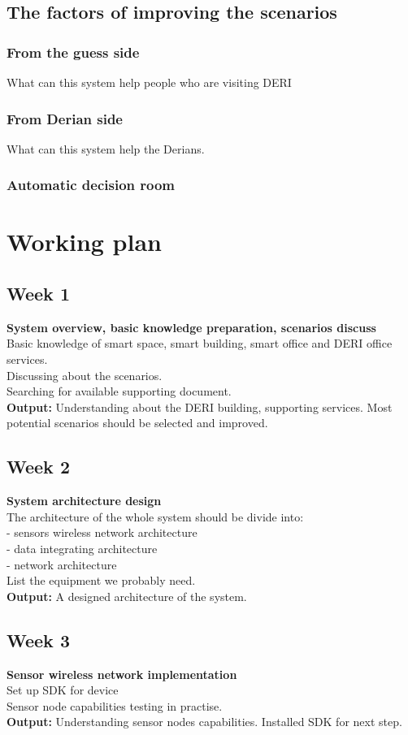 \documentclass[a4paper]{llncs}
\newcommand{\head}[1]{\textnormal {\textbf{#1}}}
\begin{document}
\subsection{The factors of improving the scenarios}
\subsubsection{From the guess side}
What can this system help  people who are visiting DERI
 \subsubsection{From Derian side}
What can this system help the Derians.
\subsubsection{Automatic decision room}

\section{Working plan}
\subsection{Week 1}
\head{System overview, basic knowledge preparation, scenarios discuss }\\
Basic knowledge of smart space, smart building, smart office and DERI office services.\\
Discussing about the scenarios.\\
Searching for available supporting document.\\
\head{Output: } Understanding about the DERI building, supporting services. Most potential scenarios should be selected and improved.
\subsection{Week 2}
\head{System architecture design}\\
The architecture of the whole system should be divide into:\\
- sensors wireless network architecture\\
- data integrating architecture\\
- network architecture\\
List the equipment we probably need.\\
\head{Output:} A designed architecture of the system.
\subsection{Week 3} 
\head{Sensor wireless network implementation}\\
Set up SDK for device\\
Sensor node capabilities testing in practise.\\
\head{Output:} Understanding sensor nodes capabilities. Installed SDK for next step.
\end{document}
